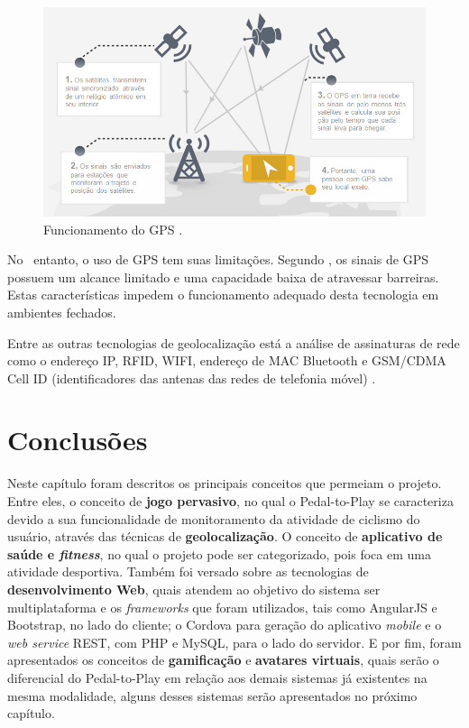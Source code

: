\begin{figure}[h]
    \caption[Funcionamento do GPS]{Funcionamento do GPS \cite{cesani2013}.}
    \centerline{\includegraphics[width=34em]{figuras/gps.png}}
    \label{fig:gps}
\end{figure}

No \ entanto, o uso de GPS tem suas limitações. Segundo \citet{sukaphat2013}, os sinais de GPS possuem um alcance limitado e uma capacidade baixa de atravessar barreiras. Estas características impedem o funcionamento adequado desta tecnologia em ambientes fechados. 

Entre as outras tecnologias de geolocalização está a análise de assinaturas de rede como o endereço IP, RFID, WIFI, endereço de MAC Bluetooth e GSM/CDMA Cell ID (identificadores das antenas das redes de telefonia móvel) \cite{w3cGeo}.
\par

\section{Conclusões}
Neste capítulo foram descritos os principais conceitos que permeiam o projeto. Entre eles, o conceito de \textbf{jogo pervasivo}, no qual o Pedal-to-Play se caracteriza devido a sua funcionalidade de monitoramento da atividade de ciclismo do usuário, através das técnicas de \textbf{geolocalização}. O conceito de \textbf{aplicativo de saúde e \textit{fitness}}, no qual o projeto pode ser categorizado, pois foca em uma atividade desportiva. Também foi versado sobre as tecnologias de \textbf{desenvolvimento Web}, quais atendem ao objetivo do sistema ser multiplataforma e os \textit{frameworks} que foram utilizados, tais como AngularJS e Bootstrap, no lado do cliente; o Cordova para geração do aplicativo \textit{mobile} e o \textit{web service} REST, com PHP e MySQL, para o lado do servidor. E por fim, foram apresentados os conceitos de \textbf{gamificação} e \textbf{avatares virtuais}, quais serão o diferencial do Pedal-to-Play em relação aos demais sistemas já existentes na mesma modalidade, alguns desses sistemas serão apresentados no próximo capítulo.